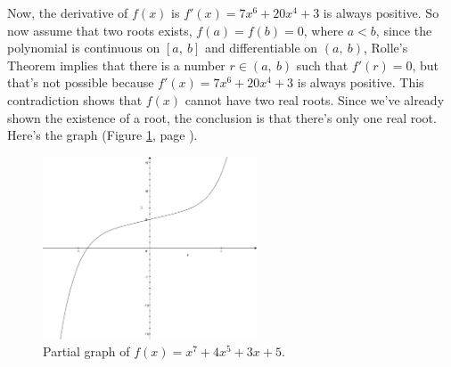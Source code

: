 \documentclass[12pt,addpoints, answers, fleqn]{exam}
\begin{document}
\begin{questions}
\begin{solution}
Now, the derivative of $f\left( x \right)$ is $f'\left( x \right) = 7x^6 + 20x^4 + 3$ is always positive. So now assume that two roots exists, $f\left( a \right) = f\left( b \right) = 0$, where $a<b$, since the polynomial is continuous  on $\left[ a, \ b \right]$ and differentiable on $\left( a, \ b \right)$, Rolle's Theorem implies that there is a number $r \in \left( a, \ b \right)$ such that $f'\left(r\right)=0$, but that's not possible because $f'\left( x \right) = 7x^6 + 20x^4 + 3$ is always positive. This contradiction shows that $f\left( x \right)$ cannot have two real roots. Since we've already shown the existence of a root, the conclusion is that there's only one real root. Here's the graph (Figure \ref{fig:graph2105}, page \pageref{fig:graph2105}).
\end{solution}
\begin{figure}[htbp] %
   \centering
   \includegraphics[width=2.5in]{./graphics/graph2105.pdf} 
   \caption{Partial graph of $f\left( x \right) = x^7 + 4x^5 + 3x + 5$.}
   \label{fig:graph2105}
\end{figure}
\end{questions}
\end{document}
